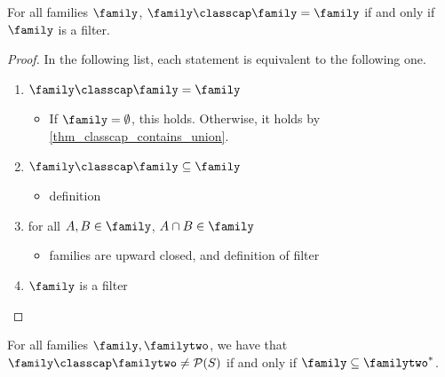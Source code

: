 \begin{theorem}
    \label{thm_classcap_idempotent_at_filters}
    For all families $\family$, $\family \classcap \family = \family$ if and only if $\family$ is a filter.
\end{theorem}

\begin{proof}
     In the following list, each statement is equivalent to the following one.
    \begin{enumerate}
        \item $\family \classcap \family = \family$
        \begin{itemize}
            \item[--] If $\family = \emptyset$, this holds.  Otherwise, it holds by \cref{thm_classcap_contains_union}.
        \end{itemize}
        \item $\family \classcap \family \subseteq \family$
        \begin{itemize}
            \item[--] definition
        \end{itemize}
        \item for all $A, B \in \family$, $A \cap B \in \family$
        \begin{itemize}
            \item[--] families are upward closed, and definition of filter
        \end{itemize}
        \item $\family$ is a filter
    \end{enumerate}
\end{proof}

\begin{theorem}
    \label{thm_classcap_full_condition}
     For all families $\family, \familytwo$, we have that $\family \classcap \familytwo \neq \mathcal{P}(S)$ if and only if $\family \subseteq \familytwo^*$.
\end{theorem}


